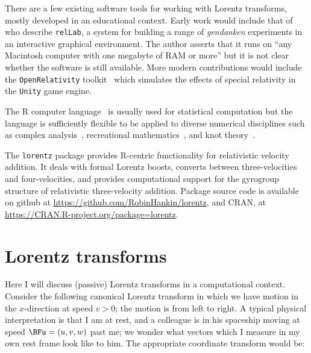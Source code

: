 \documentclass[ijoc,nonblindrev]{informs3} %
\begin{document}
There are a few existing software tools for working with Lorentz
transforms, mostly developed in an educational context.  Early work
would include that of \citet{horwitz1992} who describe {\tt relLab}, a
system for building a range of {\em gendanken} experiments in an
interactive graphical environment.  The author asserts that it runs on
``any Macintosh computer with one megabyte of RAM or more'' but it is
not clear whether the software is still available.  More modern
contributions would include the {\tt OpenRelativity}
toolkit~\citep{sherin2016} which simulates the effects of special
relativity in the {\tt Unity} game engine.

The R computer language~\citep{rcore2020} is usually used for
statistical computation but the language is sufficiently flexible to
be applied to diverse numerical disciplines such as complex
analysis~\citep{hankin2006}, recreational
mathematics~\citep{hankin2005}, and knot theory~\citep{hankin2017}.

The {\tt lorentz} package provides R-centric functionality for
relativistic velocity addition.  It deals with formal Lorentz boosts,
converts between three-velocities and four-velocities, and provides
computational support for the gyrogroup structure of relativistic
three-velocity addition.  Package source code is available on github
at \url{https://github.com/RobinHankin/lorentz}, and CRAN, at
\url{https://CRAN.R-project.org/package=lorentz}.



\section{Lorentz transforms}

\newcommand{\vvec}[2]{\begin{pmatrix}#1 \\ #2\end{pmatrix}}
\newcommand{\twomat}[4]{\begin{pmatrix} #1 & #2 \\ #3 &
    #4\end{pmatrix}}


Here I will discuss (passive) Lorentz transforms in a computational
context.  Consider the following canonical Lorentz transform in which
we have motion in the $x$-direction at speed $v>0$; the motion is from
left to right.  A typical physical interpretation is that I am at
rest, and a colleague is in his spaceship moving at speed
$\BFu=\left(u,v,w\right)$ past me; we wonder what vectors which I
measure in my own rest frame look like to him.  The appropriate
coordinate transform would be:
\end{document}
